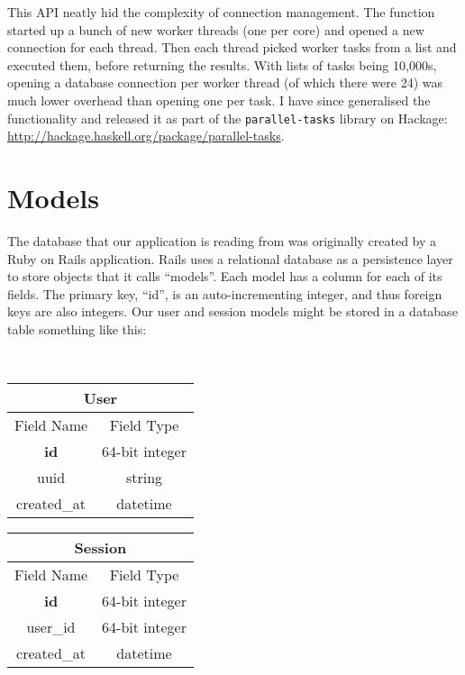 \documentclass{tmr}
\begin{document}
This API neatly hid the complexity of connection management.  The function started up a bunch of new worker threads (one per core) and opened a new connection for each thread.  Then each thread picked worker tasks from a list and executed them, before returning the results.  With lists of tasks being 10,000s, opening a database connection per worker thread (of which there were 24) was much lower overhead than opening one per task.  I have since generalised the functionality and released it as part of the \texttt{parallel-tasks} library on Hackage: \url{http://hackage.haskell.org/package/parallel-tasks}.

\section{Models}

The database that our application is reading from was originally created by a Ruby on Rails application.  Rails uses a relational database as a persistence layer to store objects that it calls ``models''.  Each model has a column for each of its fields.  The primary key, ``id'', is an auto-incrementing integer, and thus foreign keys are also integers.  Our user and session models might be stored in a database table something like this:

~\\

\begin{minipage}[c]{0.45\textwidth}
    \begin{tabular}{cc}
\multicolumn{2}{c}{User}\\ \hline
Field Name & Field Type \\ \hline
\textbf{id} & 64-bit integer \\
uuid & string \\
created\_at & datetime \\ \hline
\end{tabular}
\end{minipage}
\begin{minipage}[c]{0.45\textwidth}
\begin{tabular}{cc}
\multicolumn{2}{c}{Session}\\ \hline
Field Name & Field Type \\ \hline
\textbf{id} & 64-bit integer \\
user\_id & 64-bit integer \\
created\_at & datetime \\ \hline
\end{tabular}
\end{minipage}
\end{document}
